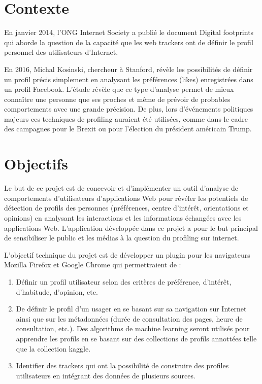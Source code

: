 \section{Contexte}

	En janvier 2014, l'ONG Internet Society a publié le document Digital footprints\cite{digital-footprints} qui aborde la question de la capacité que les web trackers ont de définir le profil personnel des utilisateurs d'Internet.
	
	En 2016, Michal Kosinski\cite{michal-kosinski}, chercheur à Stanford, révèle les possibilités de définir un profil précis simplement en analysant les préférences (likes) enregistrées dans un profil Facebook\cite{mining-big-data}. L'étude révèle que ce type d'analyse permet de mieux connaître une personne que ses proches et même de prévoir de probables comportements avec une grande précision. De plus, lors d'événements politiques majeurs ces techniques de profiling auraient été utilisées, comme dans le cadre des campagnes pour le Brexit ou pour l'élection du président américain Trump.\cite{motherboard-data}

\section{Objectifs}

	Le but de ce projet est de concevoir et d'implémenter un outil d'analyse de comportements d'utilisateurs d'applications Web pour révéler les potentiels de détection de profils des personnes (préférences, centre d'intérêt, orientations et opinions) en analysant les interactions et les informations échangées avec les applications Web. L'application développée dans ce projet a pour le but principal de sensibiliser le public et les médias à la question du profiling sur internet.

	L'objectif technique du projet est de développer un plugin pour les navigateurs Mozilla Firefox et Google Chrome qui permettraient de :

	\begin{enumerate}
		\item Définir un profil utilisateur selon des critères de préférence, d'intérêt, d'habitude, d'opinion, etc.
		\item De définir le profil d'un usager en se basant sur sa navigation sur Internet ainsi que sur les métadonnées (durée de consultation des pages, heure de consultation, etc.). Des algorithms de machine learning seront utilisés pour apprendre les profils en se basant sur des collections de profils annottées telle que la collection kaggle\cite{kaggle}. 
		\item Identifier des trackers qui ont la possibilité de construire des profiles utilisateurs en intégrant des données de plusieurs sources. 
	\end{enumerate}

